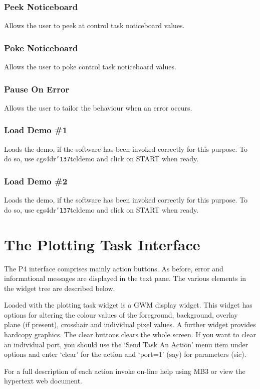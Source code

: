 \documentclass[a4paper]{book}
\renewcommand{\_}{{\tt\char'137}}
\begin{document}
\subsubsection{Peek Noticeboard}
Allows the user to peek at control task noticeboard values.

\subsubsection{Poke Noticeboard}
Allows the user to poke control task noticeboard values.

\subsubsection{Pause On Error}
Allows the user to tailor the behaviour when an error occurs.

\subsubsection{Load Demo \#1}
Loads the demo, if the software has been invoked correctly for this purpose.
To do so, use cgs4dr\_tcldemo and click on START when ready.

\subsubsection{Load Demo \#2}
Loads the demo, if the software has been invoked correctly for this purpose.
To do so, use cgs4dr\_tcldemo and click on START when ready.

\section{The Plotting Task Interface}
The P4 interface comprises mainly action buttons.
As before, error and informational messages are displayed in the text pane.
The various elements in the widget tree are described below.

Loaded with the plotting task widget is a GWM display widget. This widget
has options for altering the colour values of the foreground, background,
overlay plane (if present), crosshair and individual pixel values. A further
widget provides hardcopy graphics. The {\sc clear} buttons clears the whole screen.
If you want to clear an individual port, you should use the `Send Task An Action'
menu item under options and enter `clear' for the {\sc action} and `port=1' (say)
for {\sc parameters} (sic).

For a full description of each action invoke on-line help using MB3 or view the hypertext web document.
\end{document}
